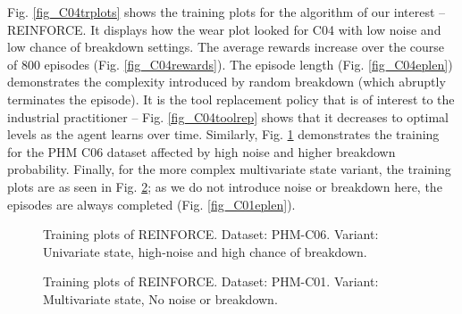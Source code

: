 \documentclass[referee, sn-mathphys-num]{sn-jnl}
\begin{document}
	Fig. \ref{fig_C04trplots} shows the training plots for the algorithm of our interest -- REINFORCE. It displays how the wear plot looked for C04 with low noise and low chance of breakdown settings. The average rewards increase over the course of 800 episodes (Fig. \ref{fig_C04rewards}). The episode length (Fig. \ref{fig_C04eplen}) demonstrates the complexity introduced by random breakdown (which abruptly terminates the episode). It is the tool replacement policy that is of interest to the industrial practitioner -- Fig. \ref{fig_C04toolrep} shows that it decreases to optimal levels as the agent learns over time. Similarly, Fig. \ref{fig_C06trplots} demonstrates the training for the PHM C06 dataset affected by high noise and higher breakdown probability. Finally, for the more complex multivariate state variant, the training plots are as seen in Fig. \ref{fig_C01trplots}; as we do not introduce noise or breakdown here, the episodes are always completed (Fig. \ref{fig_C01eplen}).
	
	\begin{figure}
		\centering	
		\hfill
		\caption{Training plots of REINFORCE. Dataset: PHM-C06. Variant: Univariate state, high-noise and high chance of breakdown.}
		\label{fig_C06trplots}
	\end{figure}
	
	\begin{figure}
		\centering	
		\hfill
		\caption{Training plots of REINFORCE. Dataset: PHM-C01. Variant: Multivariate state, No noise or breakdown.}
		\label{fig_C01trplots}
	\end{figure}
	
\end{document}
